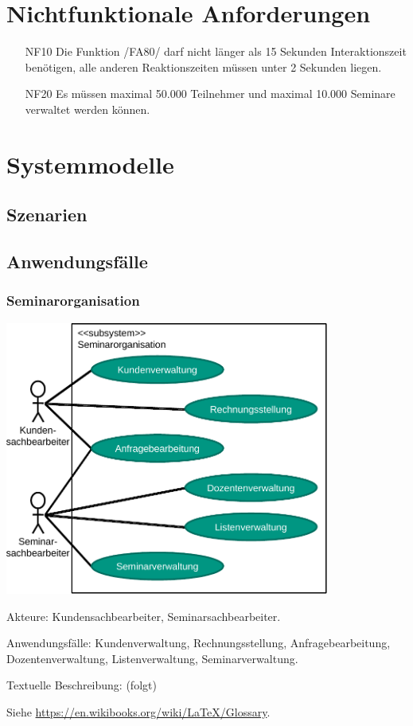 \documentclass[parskip=full]{scrartcl}
\begin{document}
\section{Nichtfunktionale Anforderungen}
\begin{itemize}[nosep]
\item[NF10] Die Funktion /FA80/ darf nicht länger als 15 Sekunden Interaktionszeit benötigen, alle anderen Reaktionszeiten müssen unter 2 Sekunden liegen.
\item[NF20] Es müssen maximal 50.000 Teilnehmer und maximal 10.000 Seminare verwaltet werden können.
\end{itemize}

\section{Systemmodelle}

\subsection{Szenarien}

\subsection{Anwendungsfälle}
\subsubsection{Seminarorganisation}
\begin{center}
\includegraphics[width=0.8\textwidth]{szenario_seminarorganisation.pdf}
\end{center}

Akteure: Kundensachbearbeiter, Seminarsachbearbeiter.

Anwendungsfälle: Kundenverwaltung, Rechnungsstellung, Anfragebearbeitung, Dozentenverwaltung, Listenverwaltung, Seminarverwaltung.

Textuelle Beschreibung: (folgt)



%
%
\printnoidxglossaries
Siehe \url{https://en.wikibooks.org/wiki/LaTeX/Glossary}.
\end{document}
